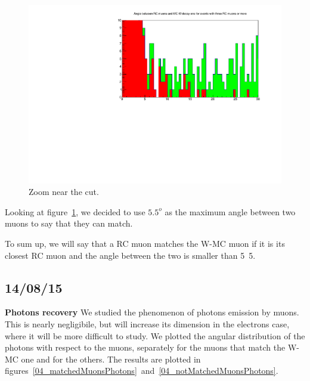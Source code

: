\begin{figure} [htp]
\centering
\includegraphics[scale=0.7]{04_muonsMatchAngleCut.pdf}
\caption{Zoom near the cut.}
\label{04_muonsMatchAngleCut}
\end{figure}

Looking at figure~\ref{04_muonsMatchAngleCut}, we decided to use $5.5^o$ as the maximum angle between two muons to say that they can match.

To sum up, we will say that a RC muon matches the W-MC muon if it is its closest RC muon and the angle between the two is smaller than \unit{5.5}{\degree}.

\subsection{14/08/15}

\textbf{Photons recovery}
We studied the phenomenon of photons emission by muons. This is nearly negligibile, but will increase its dimension in the electrons case, where it will be more difficult to study. We plotted the angular distribution of the photons with respect to the muons, separately for the muons that match the W-MC one and for the others. The results are plotted in figures~\ref{04_matchedMuonsPhotons}~and~\ref{04_notMatchedMuonsPhotons}.

